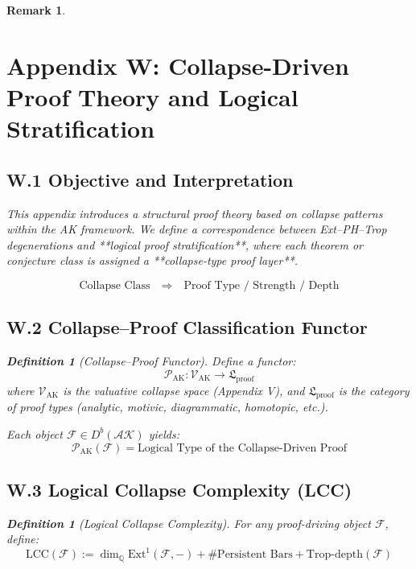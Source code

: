 \documentclass[11pt]{article}
\newtheorem{definition}[theorem]{Definition}
\newtheorem{remark}[theorem]{Remark}
\begin{document}
\begin{remark}

\section*{Appendix W: Collapse-Driven Proof Theory and Logical Stratification}

\subsection*{W.1 Objective and Interpretation}

This appendix introduces a structural proof theory based on collapse patterns within the AK framework.  
We define a correspondence between Ext–PH–Trop degenerations and **logical proof stratification**,  
where each theorem or conjecture class is assigned a **collapse-type proof layer**.

\[
\boxed{
\text{Collapse Class} \quad \Rightarrow \quad \text{Proof Type / Strength / Depth}
}
\]

\subsection*{W.2 Collapse–Proof Classification Functor}

\begin{definition}[Collapse–Proof Functor]
Define a functor:
\[
\mathscr{P}_{\mathrm{AK}} : \mathscr{V}_{\mathrm{AK}} \to \mathfrak{L}_{\mathrm{proof}}
\]
where \( \mathscr{V}_{\mathrm{AK}} \) is the valuative collapse space (Appendix V),  
and \( \mathfrak{L}_{\mathrm{proof}} \) is the category of proof types (analytic, motivic, diagrammatic, homotopic, etc.).

Each object \( \mathcal{F} \in D^b(\mathcal{AK}) \) yields:
\[
\mathscr{P}_{\mathrm{AK}}(\mathcal{F}) = \text{Logical Type of the Collapse-Driven Proof}
\]
\end{definition}

\subsection*{W.3 Logical Collapse Complexity (LCC)}

\begin{definition}[Logical Collapse Complexity]
For any proof-driving object \( \mathcal{F} \), define:
\[
\mathrm{LCC}(\mathcal{F}) := \dim_{\mathbb{Q}} \mathrm{Ext}^1(\mathcal{F}, -) + \# \text{Persistent Bars} + \mathrm{Trop\text{-}depth}(\mathcal{F})
\]


\end{definition}
\end{remark}
\end{document}
